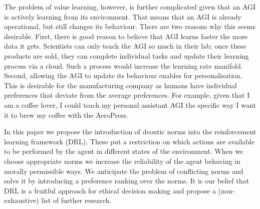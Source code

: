 The problem of value learning, however, is further complicated given that an AGI is actively learning from its environment. That means that an AGI is already operational, but still changes its behaviour. There are two reasons why this seems desirable. First, there is good reason to believe that AGI learns faster the more data it gets. Scientists can only teach the AGI so much in their lab; once these products are sold, they can complete individual tasks and update their learning process via a cloud. Such a process would increase the learning rate manifold. Second, allowing the AGI to update its behaviour enables for personalisation. This is desirable for the manufacturing company as humans have individual preferences that deviate from the average preferences. For example, given that I am a coffee lover, I could teach my personal assistant AGI the specific way I want it to brew my coffee with the AeroPress.  


In this paper we propose the introduction of deontic norms into the reinforcement learning framework (DRL). These put a restriction on which actions are available to be performed by the agent in different states of the environment. When we choose appropriate norms we increase the reliability of the agent behaving in morally permissible ways. We anticipate the problem of conflicting norms and solve it by introducing a preference ranking over the norms. It is our belief that DRL is a fruitful approach for ethical decision making and propose a (non-exhaustive) list of further research.

